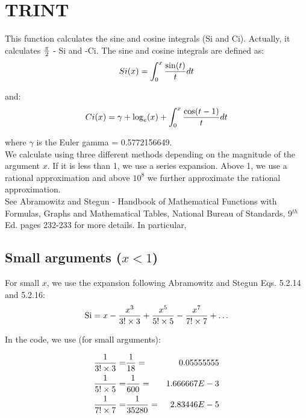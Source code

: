 \section{TRINT}
\label{sect:trint}

\noindent This function calculates the sine and cosine integrals (Si
and Ci). Actually, it calculates $\pi \over 2$ - Si and -Ci. The sine
and cosine integrals are defined as:\\

\begin{equation}
Si(x) = \int_0^x {\sin(t) \over t} dt
\end{equation}

\noindent and:\\

\begin{equation}
Ci(x) = \gamma + \log_e(x) + \int_0^x {\cos(t-1) \over t} dt
\end{equation}

\noindent where $\gamma$ is the Euler gamma = 0.5772156649.\\

\noindent We calculate using three different methods depending on the
magnitude of the argument $x$. If it is less than 1, we use a series
expansion. Above 1, we use a rational approximation and above $10^8$ we
further approximate the rational approximation.\\

\noindent See Abramowitz and Stegun - Handbook of Mathematical
Functions with Formulas, Graphs and Mathematical Tables, National
Bureau of Standards, 9$^{th}$ Ed. pages 232-233 for more details. In
particular, 

\subsection{Small arguments ($x < 1$)}

\noindent For small $x$, we use the expansion following Abramowitz and
Stegun Eqs. 5.2.14 and 5.2.16:\\

\begin{equation}
\mathrm{Si} = x - {x^3 \over 3! \times 3} + {x^5 \over 5! \times 5} -
{x^7 \over 7! \times 7} + {\ldots}
\end{equation}

\noindent In the code, we use (for small arguments):

\begin{eqnarray*}
{1 \over 3! \times 3} =& {1 \over 18}    =& 0.05555555\\
{1 \over 5! \times 5} =& {1 \over 600}   =& 1.666667E-3\\
{1 \over 7! \times 7} =& {1 \over 35280} =& 2.83446E-5
\end{eqnarray*}

